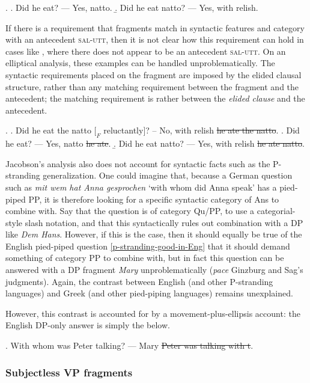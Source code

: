 \documentclass[doublespace]{umthesis}
\begin{document}
\ex. 	\a. Did he eat? --- Yes, natto.
	\b. Did he eat natto? --- Yes, with relish.
	
If there is a requirement that fragments match in syntactic features and category with an antecedent \textsc{sal-utt}, then it is not clear how this requirement can hold in cases like \Last, where there does not appear to be an antecedent \textsc{sal-utt}. On an elliptical analysis, these examples can be handled unproblematically. The syntactic requirements placed on the fragment are imposed by the elided clausal structure, rather than any matching requirement between the fragment and the antecedent; the matching requirement is rather between the \emph{elided clause} and the antecedent.

\ex. 	\a. Did he eat the natto $[_F$ reluctantly$]$? -- No, with relish \sout{he ate the natto}.
	\a. Did he eat? --- Yes, natto \sout{he ate}.
	\b. Did he eat natto? --- Yes, with relish \sout{he ate natto}.

Jacobson's analysis also does not account for syntactic facts such as the P-stranding generalization. One could imagine that, because a German question such as {\it mit wem hat Anna gesprochen} `with whom did Anna speak' has a pied-piped PP, it is therefore looking for a specific syntactic category of Ans to combine with. Say that the question is of category Qu/PP, to use a categorial-style slash notation, and that this syntactically rules out combination with a DP like {\it Dem Hans}.  However, if this is the case, then it should equally be true of the English pied-piped question \ref{p-stranding-good-in-Eng} that it should demand something of category PP to combine with, but in fact this question can be answered with a DP fragment {\it Mary} unproblematically ({\it pace} Ginzburg and Sag's judgments). Again, the contrast between English (and other P-stranding languages) and Greek (and other pied-piping languages) remains unexplained. 

However, this contrast is accounted for by a movement-plus-ellipsis account: the English DP-only answer is simply the below.

\ex. 	With whom was Peter talking? --- Mary \sout{Peter was talking with t}.

\subsubsection{Subjectless VP fragments}
\end{document}
